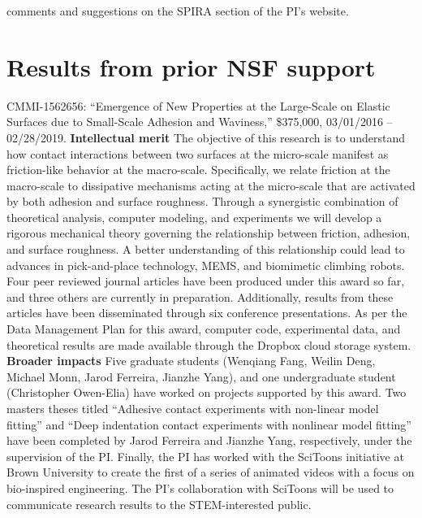 \documentclass[10pt,letterpaper]{article}
\begin{document}
comments and suggestions on the SPIRA section of the PI's website.


\section{Results from prior NSF support}
  \label{s:priorfund}
  CMMI-1562656: ``Emergence of New Properties at the Large-Scale on Elastic Surfaces due to  Small-Scale Adhesion and Waviness,'' \$375,000, 03/01/2016 -- 02/28/2019. \textbf{Intellectual merit} The objective of this research is to understand how contact interactions between two surfaces at the micro-scale manifest as friction-like behavior at the macro-scale. Specifically, we relate friction at the macro-scale to dissipative mechanisms acting at the micro-scale that are activated by both adhesion and surface roughness. Through a synergistic combination of theoretical analysis, computer modeling, and experiments we will develop a rigorous mechanical theory governing the relationship between friction, adhesion, and surface roughness. A better understanding of this relationship could lead to advances in pick-and-place technology, MEMS, and biomimetic climbing robots. Four peer reviewed journal articles have been produced under this award so far, and three others are currently in preparation. Additionally, results from these articles have been disseminated through six conference presentations. As per the Data Management Plan for this award, computer code, experimental data, and theoretical results are made available through the Dropbox cloud storage system. \textbf{Broader impacts} Five graduate students (Wenqiang Fang, Weilin Deng, Michael Monn, Jarod Ferreira, Jianzhe Yang), and one undergraduate student (Christopher Owen-Elia) have worked on projects supported by this award. Two masters theses titled ``Adhesive contact experiments with non-linear model fitting''  and ``Deep indentation contact experiments with nonlinear model fitting'' have been completed by Jarod Ferreira and Jianzhe Yang, respectively, under the supervision of the PI. Finally, the PI has worked with the SciToons initiative at Brown University to create the first of a series of animated videos with a focus on bio-inspired engineering. The PI's collaboration with SciToons will be used to communicate research results to the STEM-interested public.
\end{document}
